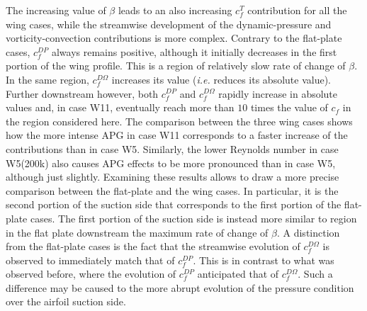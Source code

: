 The increasing value of $\beta$ leads to an also increasing $c^T_f$ contribution for all the wing cases, while the streamwise development of the dynamic-pressure and vorticity-convection contributions is more complex. Contrary to the flat-plate cases, $c^{DP}_f$ always remains positive, although it initially decreases in the first portion of the wing profile. This is a region of relatively slow rate of change of $\beta$. In the same region, $c^{D\Omega}_f$ increases its value (\textit{i.e.\!} reduces its absolute value). Further downstream however, both $c^{DP}_f$ and $c^{D\Omega}_f$ rapidly increase in absolute values and, in case W11, eventually reach more than $10$ times the value of $c_f$ in the region considered here. The comparison between the three wing cases shows how the more intense APG in case W11 corresponds to a faster increase of the contributions than in case W5. Similarly, the lower Reynolds number in case W5(200k) also causes APG effects to be more pronounced than in case W5, although just slightly. Examining these results allows to draw a more precise comparison between the flat-plate and the wing cases. In particular, it is the second portion of the suction side that corresponds to the first portion of the flat-plate cases. The first portion of the suction side is instead more similar to region in the flat plate downstream the maximum rate of change of $\beta$. A distinction from the flat-plate cases is the fact that the streamwise evolution of $c^{D\Omega}_f$ is observed to immediately match that of $c^{DP}_f$. This is in contrast to what was observed before, where the evolution of $c^{DP}_f$ anticipated that of $c^{D\Omega}_f$. Such a difference may be caused to the more abrupt evolution of the pressure condition over the airfoil suction side.


